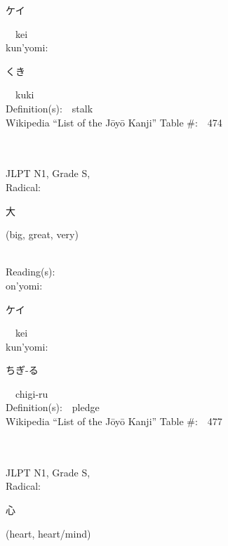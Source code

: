 \begin{multicols}{2}
{\hspace*{2em}}{\begin{CJK}{UTF8}{min} ケイ \end{CJK}}\ \ kei\ \ \\
{\hspace*{1em}}kun'yomi:\ \ \\
{\hspace*{2em}}{\begin{CJK}{UTF8}{min} くき \end{CJK}}\ \ kuki\ \ \\
Definition(s):\ \ stalk \\
Wikipedia ``List of the J\=oy\=o Kanji'' Table \#:\ \ 474 \\
\ \ \\
{\fontsize{34pt}{40pt}  }\ \ \\
{JLPT N1, Grade S, \\Radical:\ \ {\begin{CJK}{UTF8}{min} 大 \end{CJK}} (big, great, very) } \\
Reading(s):\ \ \\
{\hspace*{1em}}on'yomi:\ \ \\
{\hspace*{2em}}{\begin{CJK}{UTF8}{min} ケイ \end{CJK}}\ \ kei\ \ \\
{\hspace*{1em}}kun'yomi:\ \ \\
{\hspace*{2em}}{\begin{CJK}{UTF8}{min} ちぎ-る \end{CJK}}\ \ chigi-ru\ \ \\
Definition(s):\ \ pledge \\
Wikipedia ``List of the J\=oy\=o Kanji'' Table \#:\ \ 477 \\
\ \ \\
{\fontsize{34pt}{40pt}  }\ \ \\
{JLPT N1, Grade S, \\Radical:\ \ {\begin{CJK}{UTF8}{min} 心 \end{CJK}} (heart, heart/mind) } \\

\end{multicols}
